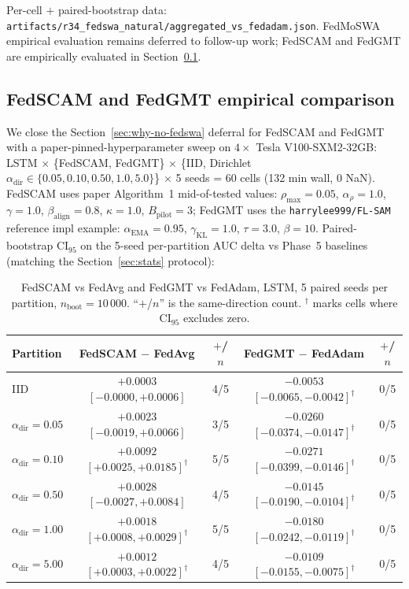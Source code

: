 \documentclass[journal]{IEEEtran}
\newcommand{\alphadir}{\ensuremath{\alpha_{\mathrm{dir}}}}
\begin{document}
Per-cell $+$ paired-bootstrap data: \lstinline|artifacts/r34_fedswa_natural/aggregated_vs_fedadam.json|. FedMoSWA empirical evaluation remains deferred to follow-up work; FedSCAM and FedGMT are empirically evaluated in Section~\ref{sec:sam-family-empirical}.


\subsection{FedSCAM and FedGMT empirical comparison}\label{sec:sam-family-empirical}

We close the Section~\ref{sec:why-no-fedswa} deferral for FedSCAM and FedGMT~\cite{FedGMT2025} with a paper-pinned-hyperparameter sweep on $4\times$ Tesla V100-SXM2-32GB: LSTM $\times$ \{FedSCAM, FedGMT\} $\times$ \{IID, Dirichlet $\alphadir \in \{0.05, 0.10, 0.50, 1.0, 5.0\}$\} $\times$ 5 seeds = 60 cells (132 min wall, 0 NaN). FedSCAM uses paper Algorithm~1 mid-of-tested values: $\rho_{\max} = 0.05$, $\alpha_\rho = 1.0$, $\gamma = 1.0$, $\beta_{\mathrm{align}} = 0.8$, $\kappa = 1.0$, $B_{\mathrm{pilot}} = 3$; FedGMT uses the \verb|harrylee999/FL-SAM| reference impl example: $\alpha_{\mathrm{EMA}} = 0.95$, $\gamma_{\mathrm{KL}} = 1.0$, $\tau = 3.0$, $\beta = 10$. Paired-bootstrap CI$_{95}$ on the 5-seed per-partition AUC delta vs Phase~5 baselines (matching the Section~\ref{sec:stats} protocol):

\begin{table}[t]
\caption{FedSCAM vs FedAvg and FedGMT vs FedAdam, LSTM, 5 paired seeds per partition, $n_{\mathrm{boot}}=10\,000$. ``$+$/$n$'' is the same-direction count. $^\dagger$ marks cells where CI$_{95}$ excludes zero.}\label{tab:sam-family-paired}
\centering
\small
\begin{tabular}{@{}lcccc@{}}
\toprule
Partition & FedSCAM $-$ FedAvg & $+$/$n$ & FedGMT $-$ FedAdam & $+$/$n$ \\
\midrule
IID                 & $+0.0003$ $[-0.0000, +0.0006]$           & 4/5   & $-0.0053$ $[-0.0065, -0.0042]^\dagger$ & 0/5 \\
$\alphadir = 0.05$  & $+0.0023$ $[-0.0019, +0.0066]$           & 3/5   & $-0.0260$ $[-0.0374, -0.0147]^\dagger$ & 0/5 \\
$\alphadir = 0.10$  & $+0.0092$ $[+0.0025, +0.0185]^\dagger$ & 5/5   & $-0.0271$ $[-0.0399, -0.0146]^\dagger$ & 0/5 \\
$\alphadir = 0.50$  & $+0.0028$ $[-0.0027, +0.0084]$           & 4/5   & $-0.0145$ $[-0.0190, -0.0104]^\dagger$ & 0/5 \\
$\alphadir = 1.00$  & $+0.0018$ $[+0.0008, +0.0029]^\dagger$ & 5/5   & $-0.0180$ $[-0.0242, -0.0119]^\dagger$ & 0/5 \\
$\alphadir = 5.00$  & $+0.0012$ $[+0.0003, +0.0022]^\dagger$ & 4/5   & $-0.0109$ $[-0.0155, -0.0075]^\dagger$ & 0/5 \\
\bottomrule
\end{tabular}
\end{table}
\end{document}
